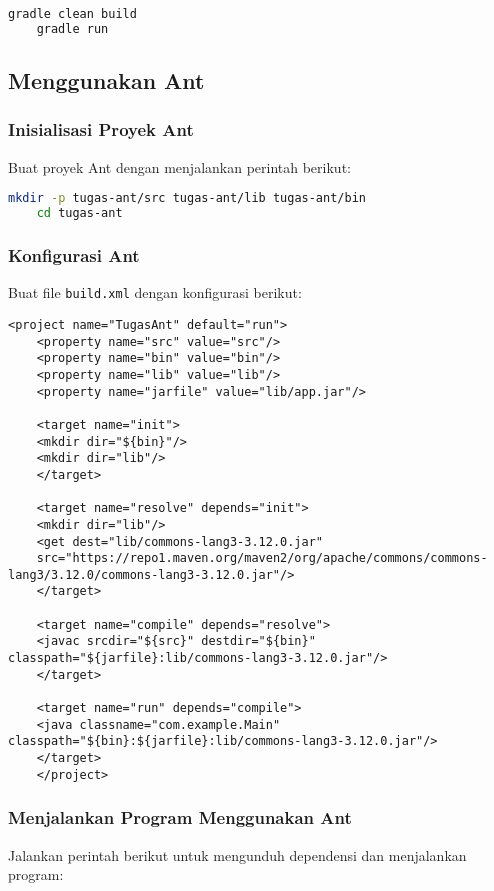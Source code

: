 \begin{lstlisting}[language=bash]
	gradle clean build
	gradle run
\end{lstlisting}

\subsection{Menggunakan Ant}
\subsubsection{Inisialisasi Proyek Ant}
Buat proyek Ant dengan menjalankan perintah berikut:

\begin{lstlisting}[language=bash]
	mkdir -p tugas-ant/src tugas-ant/lib tugas-ant/bin
	cd tugas-ant
\end{lstlisting}

\subsubsection{Konfigurasi Ant}
Buat file \texttt{build.xml} dengan konfigurasi berikut:

\begin{lstlisting}[style=XmlStyle]
	<project name="TugasAnt" default="run">
	<property name="src" value="src"/>
	<property name="bin" value="bin"/>
	<property name="lib" value="lib"/>
	<property name="jarfile" value="lib/app.jar"/>
	
	<target name="init">
	<mkdir dir="${bin}"/>
	<mkdir dir="lib"/>
	</target>
	
	<target name="resolve" depends="init">
	<mkdir dir="lib"/>
	<get dest="lib/commons-lang3-3.12.0.jar"
	src="https://repo1.maven.org/maven2/org/apache/commons/commons-lang3/3.12.0/commons-lang3-3.12.0.jar"/>
	</target>
	
	<target name="compile" depends="resolve">
	<javac srcdir="${src}" destdir="${bin}" classpath="${jarfile}:lib/commons-lang3-3.12.0.jar"/>
	</target>
	
	<target name="run" depends="compile">
	<java classname="com.example.Main" classpath="${bin}:${jarfile}:lib/commons-lang3-3.12.0.jar"/>
	</target>
	</project>
\end{lstlisting}

\subsubsection{Menjalankan Program Menggunakan Ant}
Jalankan perintah berikut untuk mengunduh dependensi dan menjalankan program:

